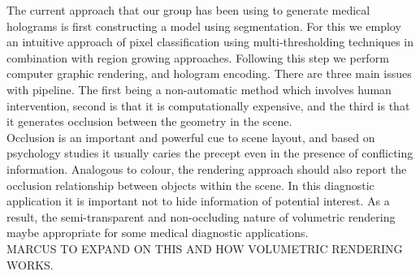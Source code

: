 The current approach that our group has been using to generate medical holograms is first constructing a model using segmentation. For this we employ an intuitive approach of pixel classification using multi-thresholding  techniques in combination with region growing approaches.  Following this step we perform computer graphic rendering, and hologram encoding.  There are three main issues with pipeline.  The first being a non-automatic method which involves human intervention, second is that it is computationally expensive, and the third is that it generates occlusion between the geometry in the scene.\\

Occlusion is an important and powerful cue to scene layout, and based on psychology studies it usually caries the precept even in the presence of conflicting information.  Analogous to colour, the rendering approach should also report the occlusion relationship between objects within the scene. In this diagnostic application it is important not to hide information of potential interest.  As a result, the semi-transparent and non-occluding nature of volumetric rendering maybe appropriate for some medical diagnostic applications.\\


MARCUS TO EXPAND ON THIS AND HOW VOLUMETRIC RENDERING WORKS.
